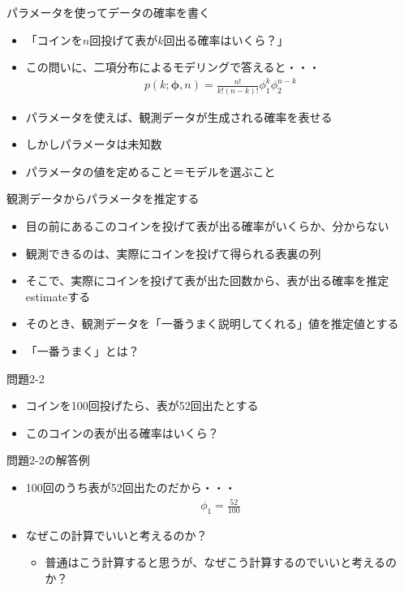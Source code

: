 \documentclass[aspectratio=169,unicode,dvipdfmx,14pt]{beamer}
\begin{document}
\begin{frame}{パラメータを使ってデータの確率を書く}
\begin{itemize}
\item 「コインを$n$回投げて表が$k$回出る確率はいくら？」
\item この問いに、二項分布によるモデリングで答えると・・・
\begin{align}
p(k;\bm{\phi},n)=\frac{n!}{k!(n-k)!}\phi_1^k\phi_2^{n-k}
\end{align}
\item パラメータを使えば、観測データが生成される確率を表せる
\item しかしパラメータは未知数
\item パラメータの値を定めること＝モデルを選ぶこと
\end{itemize}
\end{frame}

\begin{frame}{観測データからパラメータを推定する}
\begin{itemize}
\item 目の前にあるこのコインを投げて表が出る確率がいくらか、分からない
\item 観測できるのは、実際にコインを投げて得られる表裏の列
\item そこで、実際にコインを投げて表が出た回数から、表が出る確率を推定estimateする
\item そのとき、観測データを「一番うまく説明してくれる」値を推定値とする
\item 「一番うまく」とは？
\end{itemize}
\end{frame}

\begin{frame}{問題2-2}
\begin{itemize}
\item コインを100回投げたら、表が52回出たとする
\item このコインの表が出る確率はいくら？
\end{itemize}
\end{frame}

\begin{frame}{問題2-2の解答例}
\begin{itemize}
\item 100回のうち表が52回出たのだから・・・
\begin{align}
\phi_1 = \frac{52}{100}
\end{align}
\item なぜこの計算でいいと考えるのか？
\begin{itemize}
\item 普通はこう計算すると思うが、なぜこう計算するのでいいと考えるのか？
\end{itemize}
\end{itemize}
\end{frame}
\end{document}
